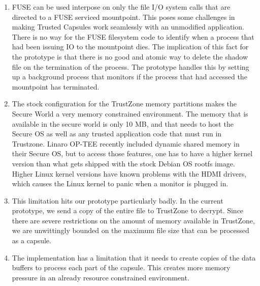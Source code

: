 \begin{enumerate}
    \item FUSE can be used interpose on only the file I/O system calls that are
directed to a FUSE serviced mountpoint. This poses some challenges in making
Trusted Capsules work seamlessly with an unmodified application.\\There is no
way for the FUSE filesystem code to identify when a process that had been
issuing IO to the mountpoint dies. The implication of this fact for the
prototype is that there is no good and atomic way to delete the shadow file on
the termination of the process. The prototype handles this by setting up a
background process that monitors if the process that had accessed the mountpoint
has terminated.
    \item The stock configuration for the TrustZone memory partitions makes the
Secure World a very memory constrained environment. The memory that is available
in the secure world is only 10 MB, and that needs to host the Secure OS as well
as any trusted application code that must run in Trustzone. Linaro OP-TEE
recently included dynamic shared memory in their Secure OS, but to access those
features, one has to have a higher kernel version than what gets shipped with
the stock Debian OS rootfs image. Higher Linux kernel versions have known
problems with the HDMI drivers, which causes the Linux kernel to panic when a
monitor is plugged in.
    \item This limitation hits our prototype particularly badly. In the
current prototype, we send a copy of the entire file to TrustZone to decrypt.
Since there are severe restrictions on the amount of memory available in
TrustZone, we are unwittingly bounded on the maximum file size that can be
processed as a capsule.
    \item The implementation has a limitation that it
needs to create copies of the data buffers to process each part of the capsule.
This creates more memory pressure in an already resource constrained
environment. 
\end{enumerate}

